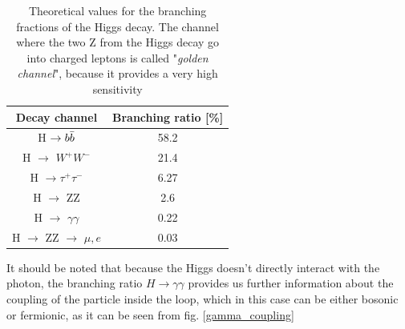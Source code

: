 \begin{table}[ht]
    \centering
    \begin{tabular}{c|c}
        Decay channel & Branching ratio [\%] \\\hline
        H $\rightarrow b\Bar{b} $ & 58.2\\  \hline
        H $\rightarrow$ $W^+ W^-$ & 21.4 \\\hline
        H $\rightarrow \tau^+ \tau^-$ & 6.27 \\\hline 
        H $\rightarrow$ ZZ & 2.6 \\\hline
        H $\rightarrow$ $\gamma\gamma$ & 0.22 \\\hline
        H $\rightarrow$ ZZ $\rightarrow$ $\mu, e$ & 0.03 \\\hline

    \end{tabular}
    \caption{Theoretical values for the branching fractions of the Higgs decay. The channel where the two Z from the Higgs decay go into charged leptons is called "\textit{golden channel}", because it provides a very high sensitivity}
    \label{BR_teor}
\end{table}
It should be noted that because the Higgs doesn't directly interact with the photon, the branching ratio $H\rightarrow\gamma\gamma$ provides us further information about the coupling of the particle inside the loop, which in this case can be either bosonic or fermionic, as it can be seen from fig. \ref{gamma_coupling}
